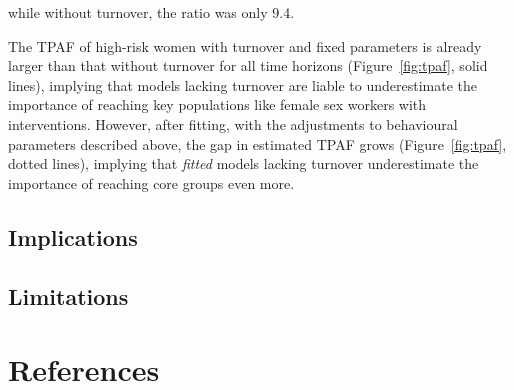 \documentclass[10pt]{article}
\numberwithin{equation}{section}
\newcommand{\fig}[1]{Figure~\ref{#1}}
\begin{document}
while without turnover, the ratio was only 9.4.
\par
The TPAF of high-risk women with turnover and fixed parameters
is already larger than that without turnover for all time horizons
(\fig{fig:tpaf}, solid lines),
implying that models lacking turnover are liable to underestimate
the importance of reaching key populations like female sex workers with interventions.
However, after fitting, with the adjustments to behavioural parameters described above,
the gap in estimated TPAF grows (\fig{fig:tpaf}, dotted lines),
implying that \textit{fitted} models lacking turnover underestimate
the importance of reaching core groups even more.
\subsection{Implications}
\subsection{Limitations}
\clearpage
\section{References}\label{s:references}
\printbibliography[heading=none]
\clearpage\appendix
\end{document}
